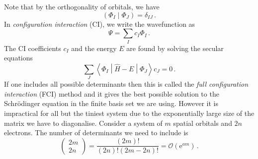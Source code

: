\documentclass{article}
\theoremstyle{plain}\theoremheaderfont{\normalfont\itshape}\theorembodyfont{\rmfamily}\theoremseparator{.}\newtheorem*{rem}{Remark}\newtheorem*{ex}{Example}\newtheorem*{proof}{Proof}\newtheorem*{altp}{Alternative proof}
\theoremstyle{plain}\theoremheaderfont{\normalfont\bfseries}\theorembodyfont{\rmfamily}\theoremseparator{.}\newtheorem{thm}{Theorem}[section]\newtheorem{lem}[thm]{Lemma}\newtheorem{prop}[thm]{Proposition}\newtheorem*{cor}{Corollary}\newtheorem{defn}[thm]{Definition}\newtheorem{clm}[thm]{Claim}\newtheorem{clminproof}{Claim}
\theoremstyle{break}\theoremheaderfont{\normalfont\itshape}\theorembodyfont{\rmfamily}\theoremseparator{.\medskip}\newtheorem*{proofskip}{Proof}\newtheorem*{exs}{Examples}\newtheorem*{rems}{Remarks}
\theoremstyle{break}\theoremheaderfont{\normalfont\bfseries}\theorembodyfont{\rmfamily}\theoremseparator{.\medskip}\newtheorem{lemskip}[thm]{Lemma}\newtheorem{defnskip}[thm]{Definition}\newtheorem{propskip}[thm]{Proposition}\newtheorem{thmskip}[thm]{Theorem}
\numberwithin{equation}{section}
\newcommand{\e}{\mathrm{e}}
\newcommand{\mel}[3]{\left\langle #1 \middle| #2 \middle| #3 \right\rangle}
\newcommand{\bracket}[2]{\left( #1 \middle| #2 \right)}
\begin{document}
    Note that by the orthogonality of orbitals, we have
    \begin{equation}
        \bracket{\Phi_I}{\Phi_J}=\delta_{IJ}\,.
    \end{equation}
    In \textit{configuration interaction} (CI), we write the wavefunction as
    \begin{equation}
        \Psi=\sum_{I}c_I\Phi_I\,.
    \end{equation} 
    The CI coefficients \(c_I\) and the energy \(E\) are found by solving the secular equations
    \begin{equation}
        \sum_{J}\mel{\Phi_I}{\hat{H}-E}{\Phi_J}c_J=0\,.
    \end{equation}
    If one includes all possible determinants then this is called the \textit{full configuration interaction} (FCI) method and it gives the best possible solution to the Schr\"{o}dinger equation in the finite basis set we are using. However it is impractical for all but the tiniest system due to the exponentially large size of the matrix we have to diagonalise. Consider a system of \(m\) spatial orbitals and \(2n\) electrons. The number of determinants we need to include is
    \begin{equation}
        \begin{pmatrix}
            2m \\ 2n
        \end{pmatrix}=\frac{(2m)!}{(2n)!(2m-2n)!}=\mathcal{O}(\e^{am})\,.
    \end{equation}
\end{document}
